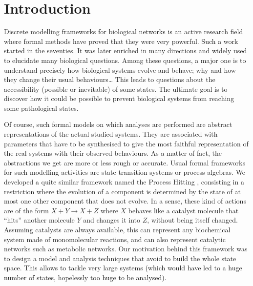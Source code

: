 \section{Introduction}
\label{sec:intro}

Discrete modelling frameworks for biological networks is an active research field where formal methods have proved that they were very powerful.
Such a work started in the seventies.
It was later enriched in many directions and widely used to elucidate many biological questions.
Among these questions, a major one is to understand precisely how biological systems evolve and behave; why and how they change their usual behaviours…
This leads to questions about the accessibility (possible or inevitable) of some states.
The ultimate goal is to discover how it could be possible to prevent biological systems from reaching some pathological states.

Of course, such formal models on which analyses are performed are abstract representations of the actual studied systems.
They are associated with parameters that have to be synthesised %
to give the most faithful representation of the real systems with their observed behaviours.
As a matter of fact, the abstractions we get are more or less rough or accurate.
Usual formal frameworks for such modelling activities are state-transition systems or process algebras. %
We developed a quite similar framework named the Process Hitting \cite{PMR10-TCSB},
consisting in a restriction where the evolution of a component is determined by the state of at most one other component that does not evolve.
In a sense, these kind of actions are of the form $X + Y \rightarrow X + Z$ where $X$ behaves like a catalyst molecule that “hits” another molecule $Y$ and changes it into $Z$, without being itself changed.
Assuming catalysts are always available, this can represent any biochemical system made of monomolecular reactions, and can also represent catalytic networks such as metabolic networks.
Our motivation behind this framework was to design a model and analysis techniques that avoid to build the whole state space.
This allows to tackle very large systems (which would have led to a huge number of states, hopelessly too huge to be analysed).

